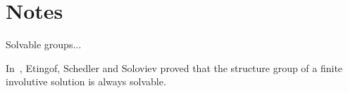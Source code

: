 
\section*{Notes}

Solvable groups...

In~\cite{MR1722951}, Etingof, Schedler and Soloviev proved that the structure group of a finite involutive
solution is always solvable. 

